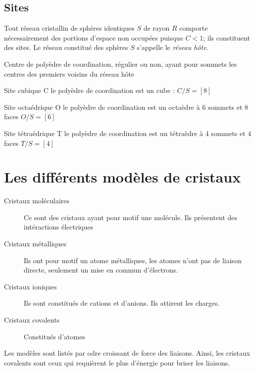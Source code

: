 \subsection{Sites}
Tout réseau cristallin de sphères identiques $S$ de rayon $R$ comporte
nécessairement des portions d'espace non occupées puisque $C < 1$; ils
constituent des sites. Le réseau constitué des sphères $S$ s'appelle le
\emph{réseau h\^ote}.
\begin{defi}
    Centre de polyèdre de coordination, régulier ou non, ayant pour sommets
    les centres des premiers voisins du réseau h\^ote
\end{defi}
\begin{ex}
    \begin{compactdesc}
        \item[Site cubique C] le polyèdre de coordination est un cube :
            $C/S = [8]$
        \item[Site octaédrique O] le polyèdre de coordination est un
            octaèdre à 6 sommets et 8 faces $O/S = [6]$
        \item[Site tétraédrique T] le polyèdre de coordination est un
            tétraèdre à 4 sommets et 4 faces $T/S = [4]$
    \end{compactdesc}
\end{ex}


\section{Les différents modèles de cristaux}
\begin{description}
    \item[Cristaux moléculaires] Ce sont des cristaux ayant pour motif une
        molécule. Ils présentent des intéractions électriques
    \item[Cristaux métalliques] Ils ont pour motif un atome métalliques, les
        atomes n'ont pas de liaison directe, seulement un mise en commun
        d'électrons.
    \item[Cristaux ioniques] Ils sont constitués de cations et d'anions. Ils
        attirent les charges.
    \item[Cristaux covalents] Constitués d'atomes
\end{description}
Les modèles sont listés par odre croissant de force des liaisons. Ainsi, les
cristaux covalents sont ceux qui requièrent le plus d'énergie pour briser
les liaisons.



